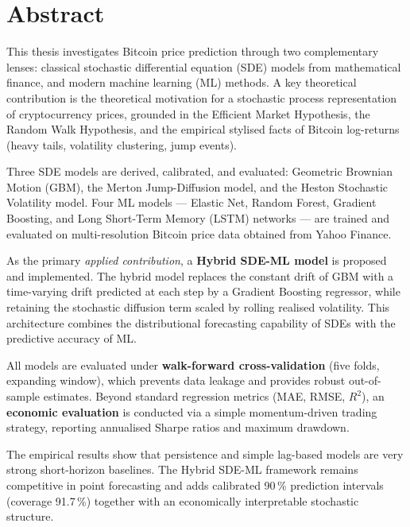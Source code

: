 \documentclass[12pt, a4paper, oneside]{report}
\theoremstyle{plain}
\theoremstyle{definition}
\theoremstyle{remark}
\begin{document}
\setcounter{page}{2}

\clearpage
\chapter*{Abstract}

This thesis investigates Bitcoin price prediction through two complementary
lenses: classical stochastic differential equation (SDE) models from
mathematical finance, and modern machine learning (ML) methods.  A key
theoretical contribution is the theoretical motivation for a stochastic
process representation of cryptocurrency prices, grounded in the Efficient
Market Hypothesis, the Random Walk Hypothesis, and the empirical stylised
facts of Bitcoin log-returns (heavy tails, volatility clustering, jump events).

Three SDE models are derived, calibrated, and evaluated: Geometric Brownian
Motion (GBM), the Merton Jump-Diffusion model, and the Heston Stochastic
Volatility model.  Four ML models --- Elastic Net, Random Forest, Gradient
Boosting, and Long Short-Term Memory (LSTM) networks --- are trained and
evaluated on multi-resolution Bitcoin price data obtained from Yahoo Finance.

As the primary \emph{applied contribution}, a \textbf{Hybrid SDE-ML model} is
proposed and implemented.  The hybrid model replaces the constant drift of GBM
with a time-varying drift predicted at each step by a Gradient Boosting
regressor, while retaining the stochastic diffusion term scaled by rolling
realised volatility.  This architecture combines the distributional forecasting
capability of SDEs with the predictive accuracy of ML.

All models are evaluated under \textbf{walk-forward cross-validation} (five
folds, expanding window), which prevents data leakage and provides robust
out-of-sample estimates.  Beyond standard regression metrics (MAE, RMSE,
$R^2$), an \textbf{economic evaluation} is conducted via a simple
momentum-driven trading strategy, reporting annualised Sharpe ratios and
maximum drawdown.

The empirical results show that persistence and simple lag-based models are
very strong short-horizon baselines. The Hybrid SDE-ML framework remains
competitive in point forecasting and adds calibrated 90\,\% prediction
intervals (coverage 91.7\,\%) together with an economically interpretable
stochastic structure.
\end{document}
